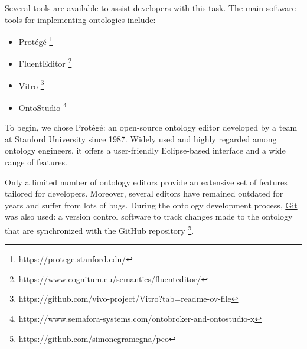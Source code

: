 Several tools are available to assist developers with this task.
The main software tools for implementing ontologies include:
\begin{itemize}
    \item Protégé \footnote{https://protege.stanford.edu/}
    \item FluentEditor \footnote{https://www.cognitum.eu/semantics/fluenteditor/}
    \item Vitro \footnote{https://github.com/vivo-project/Vitro?tab=readme-ov-file}
    \item OntoStudio \footnote{https://www.semafora-systems.com/ontobroker-and-ontostudio-x}
\end{itemize}
To begin, we chose Protégé: an open-source ontology editor developed by a team at Stanford University since 1987.
Widely used and highly regarded among ontology engineers, it offers a user-friendly Eclipse-based interface and a wide range of features.

Only a limited number of ontology editors provide an extensive set of features tailored for developers.
Moreover, several editors have remained outdated for years and suffer from lots of bugs.
During the ontology development process, \href{https://git-scm.com/}{Git} was also used: a version control software to track changes made to the ontology that are synchronized with the GitHub repository \footnote{https://github.com/simonegramegna/peo}.

